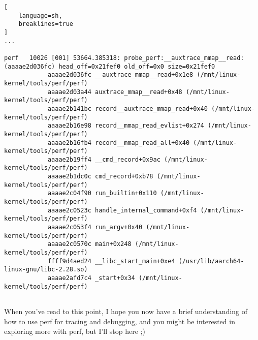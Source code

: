 \documentclass[11pt]{diazessay} %
\begin{document}
\begin{lstlisting}[
  	language=sh,
	breaklines=true
]
...

perf   10026 [001] 53664.385318: probe_perf:__auxtrace_mmap__read: (aaaae2d036fc) head_off=0x21fef0 old_off=0x0 size=0x21fef0
            aaaae2d036fc __auxtrace_mmap__read+0x1e8 (/mnt/linux-kernel/tools/perf/perf)
            aaaae2d03a44 auxtrace_mmap__read+0x48 (/mnt/linux-kernel/tools/perf/perf)
            aaaae2b141bc record__auxtrace_mmap_read+0x40 (/mnt/linux-kernel/tools/perf/perf)
            aaaae2b16e98 record__mmap_read_evlist+0x274 (/mnt/linux-kernel/tools/perf/perf)
            aaaae2b16fb4 record__mmap_read_all+0x40 (/mnt/linux-kernel/tools/perf/perf)
            aaaae2b19ff4 __cmd_record+0x9ac (/mnt/linux-kernel/tools/perf/perf)
            aaaae2b1dc0c cmd_record+0xb78 (/mnt/linux-kernel/tools/perf/perf)
            aaaae2c04f90 run_builtin+0x110 (/mnt/linux-kernel/tools/perf/perf)
            aaaae2c0523c handle_internal_command+0xf4 (/mnt/linux-kernel/tools/perf/perf)
            aaaae2c053f4 run_argv+0x40 (/mnt/linux-kernel/tools/perf/perf)
            aaaae2c0570c main+0x248 (/mnt/linux-kernel/tools/perf/perf)
            ffff9d4aed24 __libc_start_main+0xe4 (/usr/lib/aarch64-linux-gnu/libc-2.28.so)
            aaaae2afd7c4 _start+0x34 (/mnt/linux-kernel/tools/perf/perf)


\end{lstlisting}

When you've read to this point, I hope you now have a brief understanding
of how to use perf for tracing and debugging, and you might be interested
in exploring more with perf, but I'll stop here ;)
\end{document}
